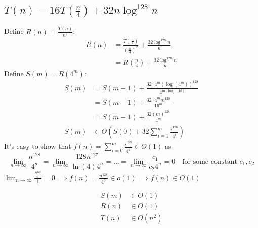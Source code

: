 \documentclass{article}
\begin{document}
\subsection{$T(n) = 16T(\frac{n}{4}) + 32n\log^{128}n$}
Define $R(n) = \frac{T(n)}{n^2}$:
\begin{align*}
    R(n) &= \frac{T(\frac{n}{4})}{(\frac{n}{4})^2} + \frac{32\log^{128}n}{n}\\
    &= R(\frac{n}{4}) + \frac{32\log^{128}n}{n}
\end{align*}
Define $S(m) = R(4^m)$:
\begin{align*}
    S(m) &= S(m - 1) + \frac{32 \cdot 4^m (\log(4^m))^{128}}{4^{m \cdot \log_4(16)}}\\
    &= S(m -1) + \frac{32\cdot 4^m m^{128}}{16^m}\\
    &= S(m-1) + \frac{32(m)^{128}}{4^m}\\
    S(m) &\in \Theta(S(0) + 32\sum_{i=1}^{m} \frac{i^{128}}{4^i})
\end{align*}
It's easy to show that $f(n) = \sum_{i=0}^{m}\frac{i^{128}}{4^i} \in O(1)$ as 
\[\lim_{n\rightarrow \infty} \frac{n^{128}}{4^n} = \lim_{n\rightarrow \infty} \frac{128 n^{127}}{\ln(4) 4^n} 
= \dots = \lim_{n \rightarrow \infty} \frac{c_1 }{c_2 4^n} = 0\quad \text{for some constant } c_1, c_2\]
$\lim_{n \rightarrow \infty} \frac{\frac{n^{128}}{4^n}}{1} = 0 \implies f(n) = \frac{n^{128}}{4^n} \in o(1) \implies f(n) \in O(1)$

\begin{align*}
    S(m) &\in O(1)\\
    R(n) &\in O(1)\\
    T(n) &\in O(n^2)
\end{align*}
\end{document}
